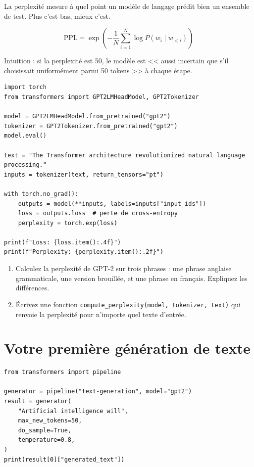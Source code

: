 La perplexit\'e mesure \`a quel point un mod\`ele de langage pr\'edit bien un ensemble de test. Plus c'est bas, mieux c'est.

\[
\text{PPL} = \exp\left(-\frac{1}{N}\sum_{i=1}^{N} \log P(w_i \mid w_{<i})\right)
\]

Intuition : si la perplexit\'e est 50, le mod\`ele est << aussi incertain que s'il choisissait uniform\'ement parmi 50 tokens >> \`a chaque \'etape.

\begin{verbatim}
import torch
from transformers import GPT2LMHeadModel, GPT2Tokenizer

model = GPT2LMHeadModel.from_pretrained("gpt2")
tokenizer = GPT2Tokenizer.from_pretrained("gpt2")
model.eval()

text = "The Transformer architecture revolutionized natural language processing."
inputs = tokenizer(text, return_tensors="pt")

with torch.no_grad():
    outputs = model(**inputs, labels=inputs["input_ids"])
    loss = outputs.loss  # perte de cross-entropy
    perplexity = torch.exp(loss)

print(f"Loss: {loss.item():.4f}")
print(f"Perplexity: {perplexity.item():.2f}")
\end{verbatim}

\begin{exercise}
\begin{enumerate}
  \item Calculez la perplexit\'e de GPT-2 sur trois phrases : une phrase anglaise grammaticale, une version brouill\'ee, et une phrase en fran\c{c}ais. Expliquez les diff\'erences.
  \item \'Ecrivez une fonction \texttt{compute\_perplexity(model, tokenizer, text)} qui renvoie la perplexit\'e pour n'importe quel texte d'entr\'ee.
\end{enumerate}
\end{exercise}

\section{Votre premi\`ere g\'en\'eration de texte}
\label{sec:first-generation}

\begin{verbatim}
from transformers import pipeline

generator = pipeline("text-generation", model="gpt2")
result = generator(
    "Artificial intelligence will",
    max_new_tokens=50,
    do_sample=True,
    temperature=0.8,
)
print(result[0]["generated_text"])
\end{verbatim}


